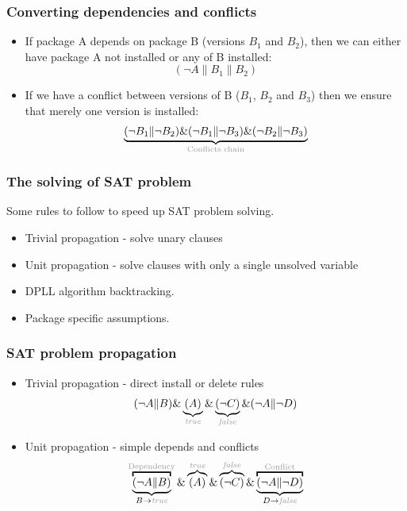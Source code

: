 \documentclass{beamer}
\begin{document}
\begin{frame}
\frametitle{Converting dependencies and conflicts}
\begin{itemize}
  \item If package A depends on package B (versions $B_1$ and $B_2$), then we
  can either have package A not installed or any of B installed:
  \bigskip
\[
(\neg A \| B_1 \| B_2)
\]
\pause
  \item If we have a conflict between versions of B ($B_1$, $B_2$ and $B_3$)
 then we ensure that merely one version is installed:
  \bigskip
\[
\underbrace{(\neg B_1 \| \neg B_2) \& (\neg B_1 \| \neg B_3) \& (\neg B_2 \|
\neg B_3)}_{\text{\color{light-gray}Conflicts chain}}
\]
\end{itemize}
\end{frame}

\begin{frame}
\frametitle{The solving of SAT problem}

Some rules to follow to speed up SAT problem solving.
\begin{itemize}
  \item Trivial propagation - solve unary clauses
  \item Unit propagation - solve clauses with only a single unsolved variable
  \item DPLL algorithm backtracking. 
  \item Package specific assumptions.
\end{itemize}
\end{frame}

\begin{frame}
\frametitle{SAT problem propagation}
\begin{itemize}
  \item Trivial propagation - direct install or delete rules
  \bigskip
  \[
  (\neg A \| B) \& \underbrace{(A)}_{\textit{\color{light-gray}true}} \&
  \underbrace{(\neg C)}_{\textit{\color{light-gray}false}} \& (\neg A \| \neg D)
  \]
  \pause
  \item Unit propagation - simple depends and conflicts
  \bigskip
  \[
  \overbracket{\underbrace{(\neg A \| B)}_{B \rightarrow
  \textit{\color{light-gray}true}}}^{\text{\color{light-gray}Dependency}} \&
  \overbrace{(A)}^{\textit{\color{light-gray}true}} \& \overbrace{(\neg
  C)}^{\textit{\color{light-gray}false}} \&
  \overbracket{\underbrace{(\neg A \| \neg D)}_{D \rightarrow
  \textit{\color{light-gray}false}}}^{\text{\color{light-gray}Conflict}}
  \]
  \
\end{itemize}
\end{frame}
\end{document}
